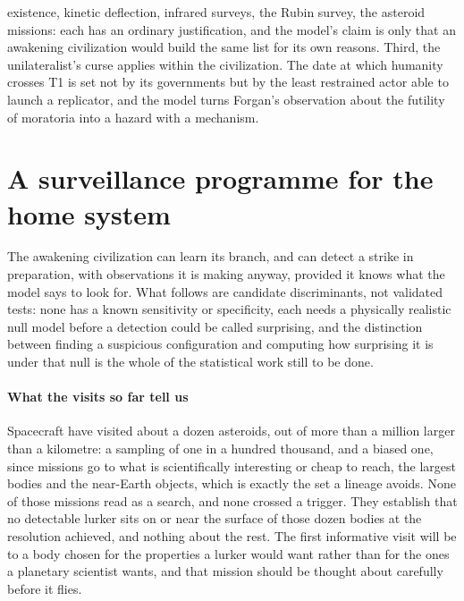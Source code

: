 \documentclass[preprint,12pt]{elsarticle}
\theoremstyle{definition}
\begin{document}
existence, kinetic deflection, infrared surveys, the Rubin survey, the asteroid missions: each has an ordinary justification, and the model's claim is only that an awakening civilization would build the same list for its own reasons. Third, the unilateralist's curse applies within the civilization. The date at which humanity crosses T1 is set not by its governments but by the least restrained actor able to launch a replicator, and the model turns Forgan's observation about the futility of moratoria \citep{Forgan2019} into a hazard with a mechanism.

\section{A surveillance programme for the home system}
\label{sec:surveillance}

The awakening civilization can learn its branch, and can detect a strike in preparation, with observations it is making anyway, provided it knows what the model says to look for. What follows are candidate discriminants, not validated tests: none has a known sensitivity or specificity, each needs a physically realistic null model before a detection could be called surprising, and the distinction between finding a suspicious configuration and computing how surprising it is under that null is the whole of the statistical work still to be done.

\paragraph{What the visits so far tell us} Spacecraft have visited about a dozen asteroids, out of more than a million larger than a kilometre: a sampling of one in a hundred thousand, and a biased one, since missions go to what is scientifically interesting or cheap to reach, the largest bodies and the near-Earth objects, which is exactly the set a lineage avoids. None of those missions read as a search, and none crossed a trigger. They establish that no detectable lurker sits on or near the surface of those dozen bodies at the resolution achieved, and nothing about the rest. The first informative visit will be to a body chosen for the properties a lurker would want rather than for the ones a planetary scientist wants, and that mission should be thought about carefully before it flies.
\end{document}
